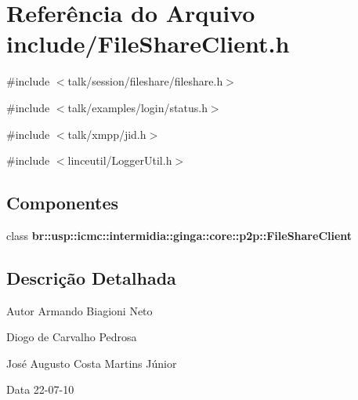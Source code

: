 \section{Referência do Arquivo include/FileShareClient.h}
\label{FileShareClient_8h}
{\ttfamily \#include $<$talk/session/fileshare/fileshare.h$>$}\par
{\ttfamily \#include $<$talk/examples/login/status.h$>$}\par
{\ttfamily \#include $<$talk/xmpp/jid.h$>$}\par
{\ttfamily \#include $<$linceutil/LoggerUtil.h$>$}\par
\subsection*{Componentes}
\begin{DoxyCompactItemize}
\item 
class {\bf br::usp::icmc::intermidia::ginga::core::p2p::FileShareClient}
\end{DoxyCompactItemize}


\subsection{Descrição Detalhada}
\begin{DoxyAuthor}{Autor}
Armando Biagioni Neto 

Diogo de Carvalho Pedrosa 

José Augusto Costa Martins Júnior 
\end{DoxyAuthor}
\begin{DoxyDate}{Data}
22-\/07-\/10 
\end{DoxyDate}
